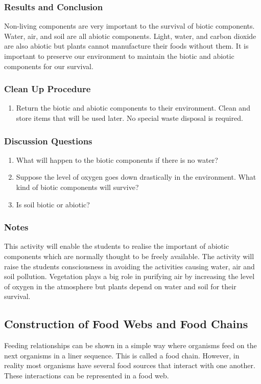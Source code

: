 \subsubsection*{Results and Conclusion}
Non-living components are very important to the survival of biotic components. Water, air, and soil are all abiotic components. Light, water, and carbon dioxide are also abiotic but plants cannot manufacture their foods without them. It is important to preserve our environment to maintain the biotic and abiotic components for our survival.

\subsubsection*{Clean Up Procedure}
\begin{enumerate}
\item{Return the biotic and abiotic components to their environment. Clean and store items that will be used later. No special waste disposal is required.}
\end{enumerate}

\subsubsection*{Discussion Questions}
\begin{enumerate}
\item{What will happen to the biotic components if there is no water?}
\item{Suppose the level of oxygen goes down drastically in the environment. What kind of biotic components will survive?}
\item{Is soil biotic or abiotic?}
\end{enumerate}

\subsubsection*{Notes}
This activity will enable the students to realise the important of abiotic components which are normally thought to be freely available. The activity will raise the students consciousness in avoiding the activities causing water, air and soil pollution. Vegetation plays a big role in purifying air by increasing the level of oxygen in the atmosphere but plants depend on water and soil for their survival.


\subsection{Construction of Food Webs and Food Chains}
Feeding relationships can be shown in a simple way where organisms feed on the next organisms in a liner sequence. This is called a food chain. However, in reality most organisms have several food sources that interact with one another. These interactions can be represented in a food web.

